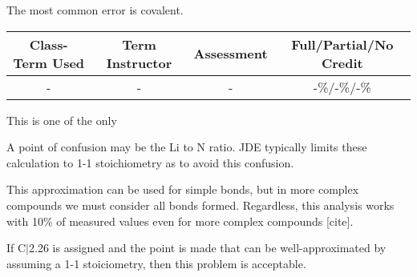 \begin{outcomes}

The most common error is covalent.

\begin{center}
	\begin{tabular}{cccc}
		\hline\hline
		Class-Term Used & Term Instructor & Assessment & Full/Partial/No Credit \\
		\hline
		- & - & - & -\%/-\%/-\%\\    %
		\hline
	\end{tabular}
\end{center}

\end{outcomes}
%
\begin{comments}

This is one of the only 

A point of confusion may be the Li to N ratio. JDE typically limits these calculation to 1-1 stoichiometry as to avoid this confusion.

This approximation can be used for simple bonds, but in more complex compounds we must consider all bonds formed. Regardless, this analysis works with 10\% of measured values even for more complex compounds [cite].

If C$|$2.26 is assigned and the point is made that  can be well-approximated by assuming a 1-1 stoiciometry, then this problem is acceptable.
\end{comments}